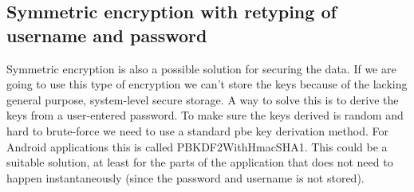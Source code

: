 \subsection{Symmetric encryption with retyping of username and password}
Symmetric encryption is also a possible solution for securing the data. If we are going to use this type of encryption we can’t store the keys because of the lacking general purpose, system-level secure storage.
\newline
\newline
A way to solve this is to derive the keys from a user-entered password. To make sure the keys derived is random and hard to brute-force we need to use a standard \gls{pbe} key derivation method. For Android applications this is called PBKDF2WithHmacSHA1.
\newline
\newline
This could be a suitable solution, at least for the parts of the application that does not need to happen instantaneously (since the password and username is not stored).

